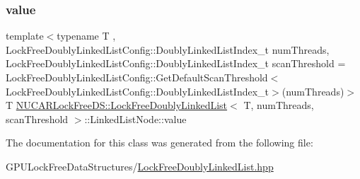 \mbox{\label{class_n_u_c_a_r_lock_free_d_s_1_1_lock_free_doubly_linked_list_1_1_linked_list_node_ae9136b50ed0477d43e6b6707b90c14c1}} 
\subsubsection{\texorpdfstring{value}{value}}
{\footnotesize\ttfamily template$<$typename T , Lock\+Free\+Doubly\+Linked\+List\+Config\+::\+Doubly\+Linked\+List\+Index\+\_\+t num\+Threads, Lock\+Free\+Doubly\+Linked\+List\+Config\+::\+Doubly\+Linked\+List\+Index\+\_\+t scan\+Threshold = Lock\+Free\+Doubly\+Linked\+List\+Config\+::\+Get\+Default\+Scan\+Threshold$<$\+Lock\+Free\+Doubly\+Linked\+List\+Config\+::\+Doubly\+Linked\+List\+Index\+\_\+t$>$(num\+Threads)$>$ \\
T \mbox{\hyperlink{class_n_u_c_a_r_lock_free_d_s_1_1_lock_free_doubly_linked_list}{N\+U\+C\+A\+R\+Lock\+Free\+D\+S\+::\+Lock\+Free\+Doubly\+Linked\+List}}$<$ T, num\+Threads, scan\+Threshold $>$\+::Linked\+List\+Node\+::value}



The documentation for this class was generated from the following file\+:\begin{DoxyCompactItemize}
\item 
G\+P\+U\+Lock\+Free\+Data\+Structures/\mbox{\hyperlink{_lock_free_doubly_linked_list_8hpp}{Lock\+Free\+Doubly\+Linked\+List.\+hpp}}\end{DoxyCompactItemize}
